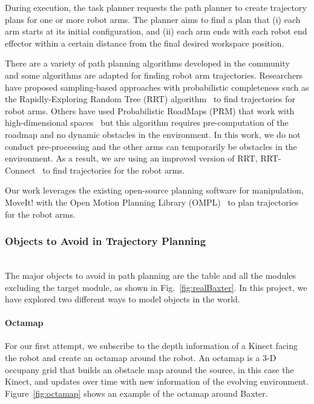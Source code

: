 During execution, the task planner requests the path planner to create trajectory plans for one or more robot arms. The planner aims to find a plan that (i) each arm starts at its initial configuration, and (ii) each arm ends with each robot end effector within a certain distance from the final desired workspace position. 

There are a variety of path planning algorithms developed in the community~\cite{DBLP:books/daglib/0016830} and some algorithms are adapted for finding robot arm trajectories. 
Researchers have proposed sampling-based approaches with probabilistic completeness such as the Rapidly-Exploring Random Tree (RRT) algorithm~\cite{VahrenkampBAKD09} to find trajectories for robot arms. Others have used Probabilistic RoadMaps (PRM) that work with high-dimensional spaces~\cite{KavrakiSLO96} but this algorithm requires pre-computation of the roadmap and no dynamic obstacles in the environment. In this work, we do not conduct pre-processing and the other arms can temporarily be obstacles in the environment. As a result, we are using an improved version of RRT, RRT-Connect~\cite{KuffnerL00} to find trajectories for the robot arms.


Our work leverages the existing open-source planning software for manipulation, MoveIt! \cite{moveit} with the Open Motion Planning Library (OMPL)~\cite{sucan2012the-open-motion-planning-library} to plan trajectories for the robot arms. 


\subsubsection{Objects to Avoid in Trajectory Planning}~\\
The major objects to avoid in path planning are the table and all the modules excluding the target module, as shown in Fig.~\ref{fig:realBaxter}. In this project, we have explored two different ways to model objects in the world. 

\paragraph{Octamap}\label{obstacle-octamap}
For our first attempt, we subscribe to the depth information of a Kinect facing the robot and create an octamap around the robot. An octamap is a 3-D occupany grid that builds an obstacle map around the source, in this case the Kinect, and updates over time with new information of the evolving environment. Figure~\ref{fig:octamap} shows an example of the octamap around Baxter.

